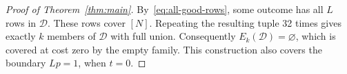 \begin{proof}[Proof of Theorem~\ref{thm:main}]
By~\eqref{eq:all-good-rows}, some outcome has all $L$ rows in
$\mathcal D$. These rows cover $[N]$. Repeating the resulting tuple
32 times gives exactly $k$ members of $\mathcal D$ with full union.
Consequently $E_k(\mathcal D)=\varnothing$, which is covered at cost
zero by the empty family. This construction also covers the boundary
$Lp=1$, when $t=0$.
\end{proof}
